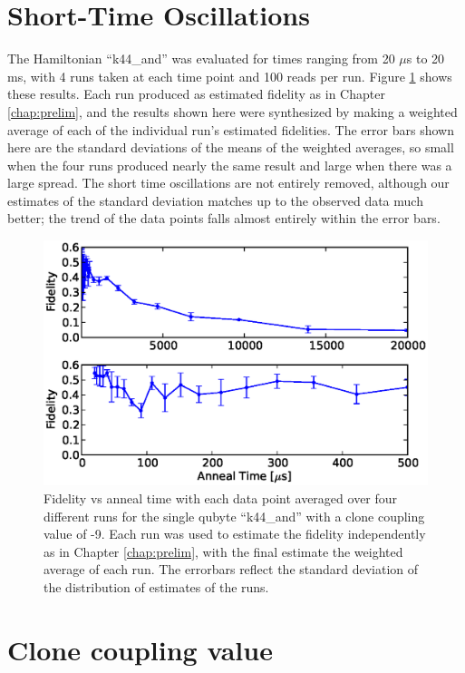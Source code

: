 \section{Short-Time Oscillations}
The Hamiltonian ``k44\_and'' was evaluated for times ranging from 20 $\mu$s to 20 ms, with 4 runs taken at each time point and 100 reads per run.  Figure \ref{fig:results_avg} shows these results.  Each run produced as estimated fidelity as in Chapter \ref{chap:prelim}, and the results shown here were synthesized by making a weighted average of each of the individual run's estimated fidelities.  The error bars shown here are the standard deviations of the means of the weighted averages, so small when the four runs produced nearly the same result and large when there was a large spread.  The short time oscillations are not entirely removed, although our estimates of the standard deviation matches up to the observed data much better; the trend of the data points falls almost entirely within the error bars.

\begin{figure}
	\includegraphics{img/final_single_k44.eps}
	\caption[Averaged Anneal Results]{Fidelity vs anneal time with each data point averaged over four different runs for the single qubyte ``k44\_and'' with a clone coupling value of -9.  Each run was used to estimate the fidelity independently as in Chapter \ref{chap:prelim}, with the final estimate the weighted average of each run.  The errorbars reflect the standard deviation of the distribution of estimates of the runs.}
	\label{fig:results_avg}
\end{figure}

\section{Clone coupling value}
\label{sec:coupling}

